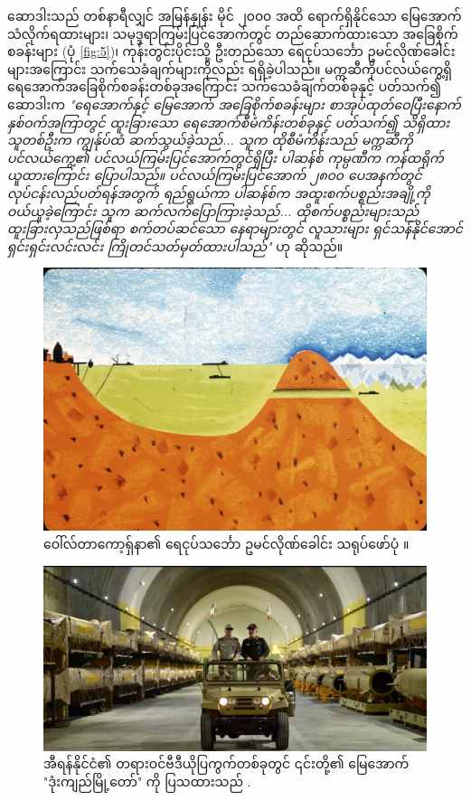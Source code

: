 \documentclass[10pt,twocolumn,letterpaper]{article}
\begin{document}
ဆောဒါးသည် တစ်နာရီလျှင် အမြန်နှုန်း မိုင် ၂၀၀၀ အထိ ရောက်ရှိနိုင်သော မြေအောက်သံလိုက်ရထားများ၊ သမုဒ္ဒရာကြမ်းပြင်အောက်တွင် တည်ဆောက်ထားသော အခြေစိုက်စခန်းများ (ပုံ \ref{fig:5})၊ ကုန်းတွင်းပိုင်းသို့ ဦးတည်သော ရေငုပ်သင်္ဘော ဥမင်လိုဏ်ခေါင်းများအကြောင်း သက်သေခံချက်များကိုလည်း ရရှိခဲ့ပါသည်။ မက္ကဆီကိုပင်လယ်ကွေ့ရှိ ရေအောက်အခြေစိုက်စခန်းတစ်ခုအကြောင်း သက်သေခံချက်တစ်ခုနှင့် ပတ်သက်၍ ဆောဒါးက \textit{"ရေအောက်နှင့် မြေအောက် အခြေစိုက်စခန်းများ စာအုပ်ထုတ်ဝေပြီးနောက် နှစ်ဝက်အကြာတွင် ထူးခြားသော ရေအောက်စီမံကိန်းတစ်ခုနှင့် ပတ်သက်၍ သိရှိထားသူတစ်ဦးက ကျွန်ုပ်ထံ ဆက်သွယ်ခဲ့သည်... သူက ထိုစီမံကိန်းသည် မက္ကဆီကိုပင်လယ်ကွေ့၏ ပင်လယ်ကြမ်းပြင်အောက်တွင်ရှိပြီး ပါဆန်စ် ကုမ္ပဏီက ကန်ထရိုက်ယူထားကြောင်း ပြောပါသည်။ ပင်လယ်ကြမ်းပြင်အောက် ၂၈၀၀ ပေအနက်တွင် လုပ်ငန်းလည်ပတ်ရန်အတွက် ရည်ရွယ်ကာ ပါဆန်စ်က အထူးစက်ပစ္စည်းအချို့ကို ဝယ်ယူခဲ့ကြောင်း သူက ဆက်လက်ပြောကြားခဲ့သည်... ထိုစက်ပစ္စည်းများသည် ထူးခြားလှသည်ဖြစ်ရာ စက်တပ်ဆင်သော နေရာများတွင် လူသားများ ရှင်သန်နိုင်အောင် ရှင်းရှင်းလင်းလင်း ကြိုတင်သတ်မှတ်ထားပါသည်"} \cite{22} ဟု ဆိုသည်။
\begin{figure}[t]
\begin{center}
   \includegraphics[width=1\linewidth]{sub.jpg}
\end{center}
   \caption{ဝေါ်လ်တာကော့ရှ်နာ၏ ရေငုပ်သင်္ဘော ဥမင်လိုဏ်ခေါင်း သရုပ်ဖော်ပုံ \cite{22,23}။}
\label{fig:6}
\label{fig:onecol}
\end{figure}
\begin{figure}[t]
\begin{center}
   \includegraphics[width=1\linewidth]{iran.jpeg}
\end{center}
   \caption{အီရန်နိုင်ငံ၏ တရားဝင်ဗီဒီယိုပြကွက်တစ်ခုတွင် ၎င်းတို့၏ မြေအောက် "ဒုံးကျည်မြို့တော်" ကို ပြသထားသည် \cite{39,40}.}
\label{fig:12}
\label{fig:onecol}
\end{figure}
\end{document}
